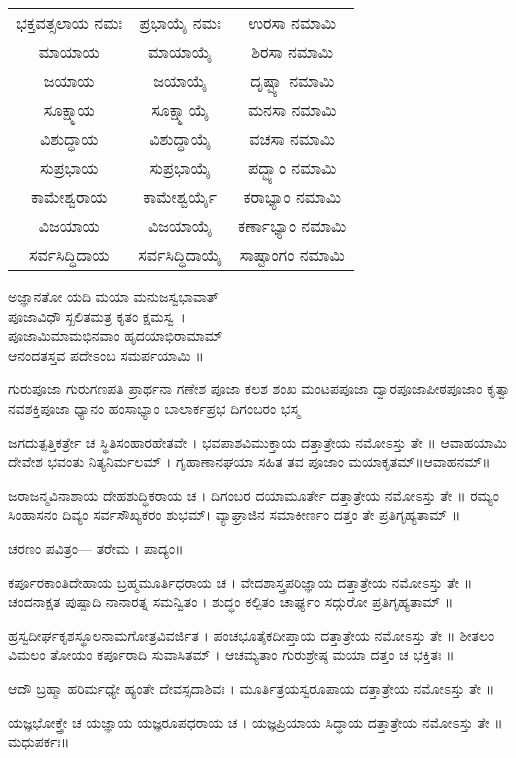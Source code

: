 \begin{tabular}{ c c c }
ಭಕ್ತವತ್ಸಲಾಯ ನಮಃ & ಪ್ರಭಾಯೈ ನಮಃ & ಉರಸಾ ನಮಾಮಿ\\
ಮಾಯಾಯ & ಮಾಯಾಯೈ & ಶಿರಸಾ ನಮಾಮಿ\\
ಜಯಾಯ & ಜಯಾಯೈ & ದೃಷ್ಟ್ಯಾ ನಮಾಮಿ\\
ಸೂಕ್ಷ್ಮಾಯ & ಸೂಕ್ಷ್ಮಾಯೈ & ಮನಸಾ ನಮಾಮಿ\\
ವಿಶುದ್ಧಾಯ & ವಿಶುದ್ಧಾಯೈ & ವಚಸಾ ನಮಾಮಿ\\
ಸುಪ್ರಭಾಯ & ಸುಪ್ರಭಾಯೈ & ಪದ್ಭ್ಯಾಂ ನಮಾಮಿ\\
ಕಾಮೇಶ್ವರಾಯ & ಕಾಮೇಶ್ವರ್ಯೈ & ಕರಾಭ್ಯಾಂ ನಮಾಮಿ\\
ವಿಜಯಾಯ & ವಿಜಯಾಯೈ & ಕರ್ಣಾಭ್ಯಾಂ ನಮಾಮಿ\\
ಸರ್ವಸಿದ್ಧಿದಾಯ & ಸರ್ವಸಿದ್ಧಿದಾಯೈ & ಸಾಷ್ಟಾಂಗಂ ನಮಾಮಿ \\
\end{tabular}

ಅಜ್ಞಾನತೋ ಯದಿ ಮಯಾ ಮನುಜಸ್ವಭಾವಾತ್\\ ಪೂಜಾವಿಧೌ ಸ್ಖಲಿತಮತ್ರ ಕೃತಂ ಕ್ಷಮಸ್ವ~।\\
ಪೂಜಾಮಿಮಾಮಭಿನವಾಂ ಹೃದಯಾಭಿರಾಮಾಮ್ \\ಆನಂದತಸ್ತವ ಪದೇಽಂಬ ಸಮರ್ಪಯಾಮಿ ॥

ಗುರುಪೂಜಾ
ಗುರುಗಣಪತಿ ಪ್ರಾರ್ಥನಾ
ಗಣೇಶ ಪೂಜಾ
ಕಲಶ ಶಂಖ ಮಂಟಪಪೂಜಾ ದ್ವಾರಪೂಜಾಪೀಠಪೂಜಾಂ ಕೃತ್ವಾ
ನವಶಕ್ತಿಪೂಜಾ
ಧ್ಯಾನಂ
ಹಂಸಾಭ್ಯಾಂ
ಬಾಲಾರ್ಕಪ್ರಭ
ದಿಗಂಬರಂ ಭಸ್ಮ

ಜಗದುತ್ಪತ್ತಿಕರ್ತ್ರೇ ಚ ಸ್ಥಿತಿಸಂಹಾರಹೇತವೇ ।
ಭವಪಾಶವಿಮುಕ್ತಾಯ ದತ್ತಾತ್ರೇಯ ನಮೋಽಸ್ತು ತೇ ॥
ಆವಾಹಯಾಮಿ ದೇವೇಶ ಭವಂತು ನಿತ್ಯನಿರ್ಮಲಮ್ ।
ಗೃಹಾಣಾನಘಯಾ ಸಹಿತ ತವ ಪೂಜಾಂ ಮಯಾಕೃತಮ್॥ಆವಾಹನಮ್॥

ಜರಾಜನ್ಮವಿನಾಶಾಯ ದೇಹಶುದ್ಧಿಕರಾಯ ಚ ।
ದಿಗಂಬರ ದಯಾಮೂರ್ತೇ ದತ್ತಾತ್ರೇಯ ನಮೋಽಸ್ತು ತೇ ॥
ರಮ್ಯಂ ಸಿಂಹಾಸನಂ ದಿವ್ಯಂ ಸರ್ವಸೌಖ್ಯಕರಂ ಶುಭಮ್।
ವ್ಯಾಘ್ರಾಜಿನ ಸಮಾಕೀರ್ಣಂ ದತ್ತಂ ತೇ ಪ್ರತಿಗೃಹ್ಯತಾಮ್ ॥

ಚರಣಂ ಪವಿತ್ರಂ--- ತರೇಮ ।
ಪಾದ್ಯಂ॥

ಕರ್ಪೂರಕಾಂತಿದೇಹಾಯ ಬ್ರಹ್ಮಮೂರ್ತಿಧರಾಯ ಚ ।
ವೇದಶಾಸ್ತ್ರಪರಿಜ್ಞಾಯ ದತ್ತಾತ್ರೇಯ ನಮೋಽಸ್ತು ತೇ ॥ 
ಚಂದನಾಕ್ಷತ ಪುಷ್ಪಾದಿ ನಾನಾರತ್ನ ಸಮನ್ವಿತಂ ।
ಶುದ್ಧಂ ಕಲ್ಪಿತಂ ಚಾರ್ಘ್ಯಂ ಸದ್ಗುರೋ ಪ್ರತಿಗೃಹ್ಯತಾಮ್ ॥

ಹ್ರಸ್ವದೀರ್ಘಕೃಶಸ್ಥೂಲನಾಮಗೋತ್ರವಿವರ್ಜಿತ ।
ಪಂಚಭೂತೈಕದೀಪ್ತಾಯ ದತ್ತಾತ್ರೇಯ ನಮೋಽಸ್ತು ತೇ ॥ 
ಶೀತಲಂ ವಿಮಲಂ ತೋಯಂ ಕರ್ಪೂರಾದಿ ಸುವಾಸಿತಮ್ ।
ಆಚಮ್ಯತಾಂ ಗುರುಶ್ರೇಷ್ಠ ಮಯಾ ದತ್ತಂ ಚ ಭಕ್ತಿತಃ ॥

ಆದೌ ಬ್ರಹ್ಮಾ ಹರಿರ್ಮಧ್ಯೇ ಹ್ಯಂತೇ ದೇವಸ್ಸದಾಶಿವಃ ।
ಮೂರ್ತಿತ್ರಯಸ್ವರೂಪಾಯ ದತ್ತಾತ್ರೇಯ ನಮೋಽಸ್ತು ತೇ ॥


ಯಜ್ಞಭೋಕ್ತ್ರೇ ಚ ಯಜ್ಞಾಯ ಯಜ್ಞರೂಪಧರಾಯ ಚ ।
ಯಜ್ಞಪ್ರಿಯಾಯ ಸಿದ್ಧಾಯ ದತ್ತಾತ್ರೇಯ ನಮೋಽಸ್ತು ತೇ ॥ಮಧುಪರ್ಕಃ॥


